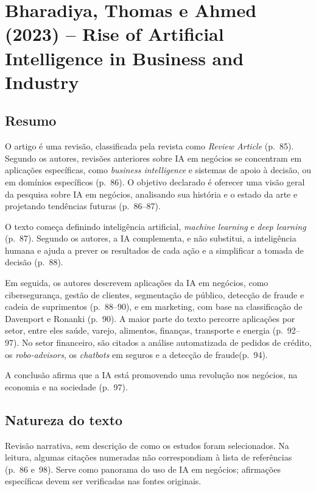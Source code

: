 \section{Bharadiya, Thomas e Ahmed (2023) -- Rise of Artificial Intelligence in Business and Industry}

\subsection*{Resumo}

O artigo é uma revisão, classificada pela revista como \emph{Review Article} (p.~85). Segundo os autores, revisões anteriores sobre IA em negócios se concentram em aplicações específicas, como \emph{business intelligence} e sistemas de apoio à decisão, ou em domínios específicos (p.~86). O objetivo declarado é oferecer uma visão geral da pesquisa sobre IA em negócios, analisando sua história e o estado da arte e projetando tendências futuras (p.~86--87).

O texto começa definindo inteligência artificial, \emph{machine learning} e \emph{deep learning} (p.~87). Segundo os autores, a IA complementa, e não substitui, a inteligência humana e ajuda a prever os resultados de cada ação e a simplificar a tomada de decisão (p.~88).

Em seguida, os autores descrevem aplicações da IA em negócios, como cibersegurança, gestão de clientes, segmentação de público, detecção de fraude e cadeia de suprimentos (p.~88--90), e em marketing, com base na classificação de Davenport e Ronanki (p.~90). A maior parte do texto percorre aplicações por setor, entre eles saúde, varejo, alimentos, finanças, transporte e energia (p.~92--97). No setor financeiro, são citados a análise automatizada de pedidos de crédito, os \emph{robo-advisors}, os \emph{chatbots} em seguros e a detecção de fraude(p.~94).

A conclusão afirma que a IA está promovendo uma revolução nos negócios, na economia e na sociedade (p.~97).

\subsection*{Natureza do texto}

Revisão narrativa, sem descrição de como os estudos foram selecionados. Na leitura, algumas citações numeradas não correspondiam à lista de referências (p.~86 e~98). Serve como panorama do uso de IA em negócios; afirmações específicas devem ser verificadas nas fontes originais.

